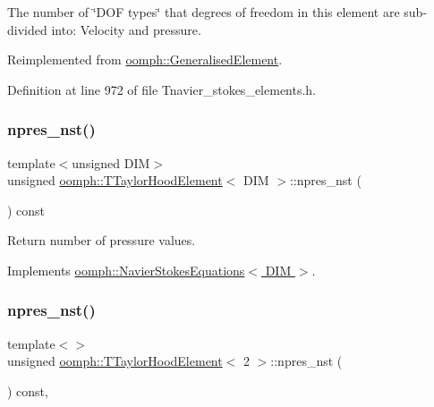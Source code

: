 The number of \char`\"{}\+D\+O\+F types\char`\"{} that degrees of freedom in this element are sub-\/divided into\+: Velocity and pressure. 



Reimplemented from \hyperlink{classoomph_1_1GeneralisedElement_a0c6037a870597b35dcf1c780710b9a56}{oomph\+::\+Generalised\+Element}.



Definition at line 972 of file Tnavier\+\_\+stokes\+\_\+elements.\+h.

\mbox{\label{classoomph_1_1TTaylorHoodElement_ae8b8462176202ddc647cd59c731d9eb9}} 
\subsubsection{\texorpdfstring{npres\+\_\+nst()}{npres\_nst()}\hspace{0.1cm}{\footnotesize\ttfamily [1/3]}}
{\footnotesize\ttfamily template$<$unsigned D\+IM$>$ \\
unsigned \hyperlink{classoomph_1_1TTaylorHoodElement}{oomph\+::\+T\+Taylor\+Hood\+Element}$<$ D\+IM $>$\+::npres\+\_\+nst (\begin{DoxyParamCaption}{ }\end{DoxyParamCaption}) const\hspace{0.3cm}{\ttfamily [virtual]}}



Return number of pressure values. 



Implements \hyperlink{classoomph_1_1NavierStokesEquations_a4a17a76873bf3131d1e0acc74fb1c2d8}{oomph\+::\+Navier\+Stokes\+Equations$<$ D\+I\+M $>$}.

\mbox{\label{classoomph_1_1TTaylorHoodElement_a2e07d9fa250ad11396677a14f6d21a4a}} 
\subsubsection{\texorpdfstring{npres\+\_\+nst()}{npres\_nst()}\hspace{0.1cm}{\footnotesize\ttfamily [2/3]}}
{\footnotesize\ttfamily template$<$$>$ \\
unsigned \hyperlink{classoomph_1_1TTaylorHoodElement}{oomph\+::\+T\+Taylor\+Hood\+Element}$<$ 2 $>$\+::npres\+\_\+nst (\begin{DoxyParamCaption}{ }\end{DoxyParamCaption}) const\hspace{0.3cm}{\ttfamily [inline]}, {\ttfamily [virtual]}}

